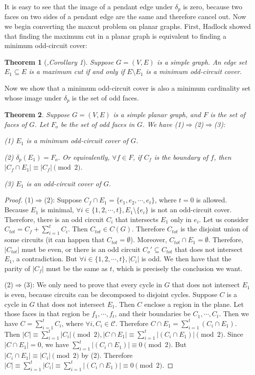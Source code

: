 \documentclass[10pt,fleqn]{article}
\newtheorem{theorem}{Theorem}[section]
\newcommand{\rs}{\setminus}
\newcommand{\mc}[1]{\mathcal{#1}}
\newcommand{\imp}{\Rightarrow}
\begin{document}
	It is easy to see that the image of a pendant edge under $\delta_p$ is zero, because two faces on two sides of a pendant edge are the same and therefore cancel out. Now we begin converting the maxcut problem on planar graphs. First, Hadlock showed that finding the maximum cut in a planar graph is equivalent to finding a minimum odd-circuit cover:
	\begin{theorem}[\it{\cite{79},Corollary 1}]\label{thm01}
		Suppose $G=(V,E)$ is a simple graph. An edge set $E_1\subseteq E$ is a maximum cut if and only if $E\rs E_1$ is a minimum odd-circuit cover.
	\end{theorem} \par
	Now we show that a minimum odd-circuit cover is also a minimum cardinality set whose image under $\delta_p$ is the set of odd faces.
	\begin{theorem}\label{thm02}
		Suppose $G=(V,E)$ is a simple planar graph, and $F$ is the set of faces of $G$. Let $F_o$ be the set of odd faces in $G$. We have (1)$\imp$(2)$\imp$(3):\par
		(1) $E_1$ is a minimum odd-circuit cover of $G$. \par
		(2) $\delta_p(E_1) = F_o$. Or equivalently, $\forall f\in F$, if $C_f$ is the boundary of $f$, then $|C_f\cap E_1|\equiv|C_f|\pmod{2}$. \par
		(3) $E_1$ is an odd-circuit cover of $G$.
	\end{theorem}
	\begin{proof}
		(1)$\imp$(2): Suppose $C_f\cap E_1=
		\{e_1,e_2,\cdots,e_t\}$, where $t=0$ is allowed. Because $E_1$ is minimal, $\forall i\in\{1,2,\cdots,t\},E_1\rs\{e_i\}$ is not an odd-circuit cover. Therefore, there is an odd circuit $C_i$ that intersects $E_1$ only in $e_i$. Let us consider $C_{tot}=C_f+\sum_{i=1}^tC_i$. Then $C_{tot}\in C(G)$. Therefore $C_{tot}$ is the disjoint union of some circuits (it can happen that $C_{tot}=\emptyset$). Moreover, $C_{tot}\cap E_1=\emptyset$. Therefore, $|C_{tot}|$ must be even, or there is an odd circuit $C_o'\subseteq C_{tot}$ that does not intersect $E_1$, a contradiction. But $\forall i\in\{1,2,\cdots,t\},|C_i|$ is odd. We then have that the parity of $|C_f|$ must be the same as $t$, which is precisely the conclusion we want. \par
		(2)$\imp$(3): We only need to prove that every cycle in $G$ that does not intersect $E_1$ is even, because circuits can be decomposed to disjoint cycles. Suppose $C$ is a cycle in $G$ that does not intersect $E_1$. Then $C$ enclose a region in the plane. Let those faces in that region be $f_1,\cdots,f_t$, and their boundaries be $C_1,\cdots,C_t$. Then we have $C=\sum_{i=1}^tC_i$, where $\forall i,C_i\in\mc{C}$. Therefore $C\cap E_1=\sum_{i=1}^t(C_i\cap E_1)$. Then $|C|\equiv\sum_{i=1}^t|C_i|\pmod{2},|C\cap E_1|\equiv\sum_{i=1}^t|(C_i\cap E_1)|\pmod{2}$. Since $|C\cap E_1| = 0$, we have $\sum_{i=1}^t|(C_i\cap E_1)|\equiv 0\pmod{2}$. But $|C_i\cap E_1|\equiv|C_i|\pmod{2}$ by (2). Therefore $|C|\equiv\sum_{i=1}^t|C_i|\equiv\sum_{i=1}^t|(C_i\cap E_1)|\equiv 0\pmod{2}$.
	\end{proof} \par
\end{document}
